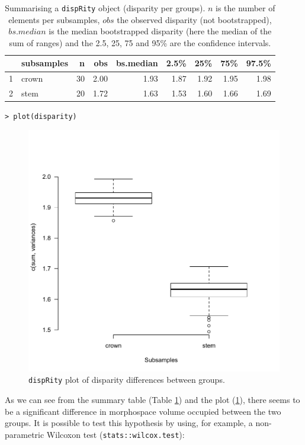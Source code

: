 \documentclass[12pt,letterpaper]{article}
\newcommand{\disp}{\texttt{dispRity} }
\begin{document}
\begin{table}[ht]
\centering
\begin{tabular}{rlrrrrrrr}
  \hline
 & subsamples & n & obs & bs.median & 2.5\% & 25\% & 75\% & 97.5\% \\ 
  \hline
1 & crown &  30 & 2.00 & 1.93 & 1.87 & 1.92 & 1.95 & 1.98 \\ 
  2 & stem &  20 & 1.72 & 1.63 & 1.53 & 1.60 & 1.66 & 1.69 \\ 
   \hline
\end{tabular}
\caption{Summarising a \disp object (disparity per groups). $n$ is the number of elements per subsamples, $obs$ the observed disparity (not bootstrapped), $bs.median$ is the median bootstrapped disparity (here the median of the sum of ranges) and the 2.5, 25, 75 and 95\% are the confidence intervals.}
\label{Tab:summary_group}
\end{table}

\noindent \texttt{> plot(disparity)}

\begin{figure}[!htbp]
\centering
   \includegraphics[width=1\textwidth]{plot_example_group.pdf} 
\caption{\disp plot of disparity differences between groups.}
\label{Fig:plot_group}
\end{figure}

As we can see from the summary table (Table \ref{Tab:summary_group}) and the plot (\ref{Fig:plot_group}), there seems to be a significant difference in morphospace volume occupied between the two groups.
It is possible to test this hypothesis by using, for example, a non-parametric Wilcoxon test (\texttt{stats::wilcox.test}):
\end{document}
